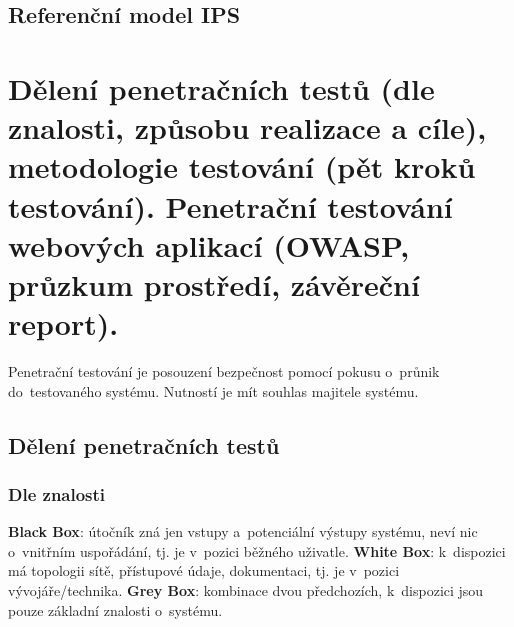 \subsection{Referenční model IPS}

\begin{figure}[ht]
\centering
{}
\end{figure}

\clearpage
\section{Dělení penetračních testů (dle znalosti, způsobu realizace a cíle), metodologie testování (pět kroků testování). Penetrační testování webových aplikací (OWASP, průzkum prostředí, závěreční report).}

Penetrační testování je posouzení bezpečnost pomocí pokusu o~průnik do~testovaného systému. Nutností je mít souhlas majitele systému.

\subsection{Dělení penetračních testů}

\subsubsection*{Dle znalosti}

\textbf{Black Box}: útočník zná jen vstupy a~potenciální výstupy systému, neví nic o~vnitřním uspořádání, tj. je v~pozici běžného uživatle. \textbf{White Box}: k~dispozici má topologii sítě, přístupové údaje, dokumentaci, tj. je v~pozici vývojáře/technika. \textbf{Grey Box}: kombinace dvou předchozích, k~dispozici jsou pouze základní znalosti o~systému.

